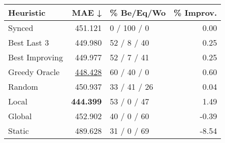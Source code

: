 \begin{tabular}{lrlr}
\toprule
\textbf{Heuristic} & \textbf{MAE ↓} & \textbf{\% Be/Eq/Wo} & \textbf{\% Improv.} \\
\midrule
            Synced &        451.121 &          0 / 100 / 0 &                0.00 \\
\midrule
       Best Last 3 &        449.980 &          52 / 8 / 40 &                0.25 \\
    Best Improving &        449.977 &          52 / 7 / 41 &                0.25 \\
\addlinespace
     Greedy Oracle &        \underline{448.428} &          60 / 40 / 0 &                0.60 \\
            Random &        450.937 &         33 / 41 / 26 &                0.04 \\
\midrule
             Local &        \textbf{444.399} &          53 / 0 / 47 &                1.49 \\
            Global &        452.902 &          40 / 0 / 60 &               -0.39 \\
\midrule
            Static &        489.628 &          31 / 0 / 69 &               -8.54 \\
\bottomrule
\end{tabular}

\label{tab:non_lr01_le2_bs2_Summary}
